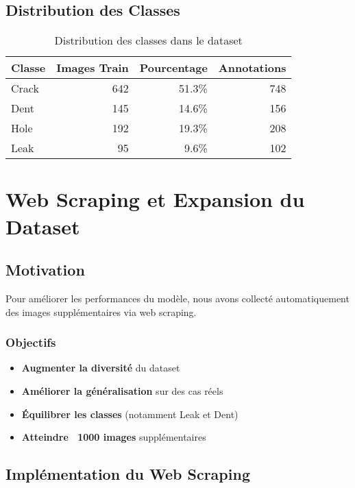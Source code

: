 \documentclass[a4paper,12pt]{report}
\begin{document}
\section{Distribution des Classes}

\begin{table}[H]
    \centering
    \begin{tabular}{|l|r|r|r|}
    \hline
    \textbf{Classe} & \textbf{Images Train} & \textbf{Pourcentage} & \textbf{Annotations} \\
    \hline
    Crack & 642 & 51.3\% & 748 \\
    \hline
    Dent & 145 & 14.6\% & 156 \\
    \hline
    Hole & 192 & 19.3\% & 208 \\
    \hline
    Leak & 95 & 9.6\% & 102 \\
    \hline
    \end{tabular}
    \caption{Distribution des classes dans le dataset}
\end{table}

\chapter{Web Scraping et Expansion du Dataset}

\section{Motivation}

Pour améliorer les performances du modèle, nous avons collecté automatiquement des images supplémentaires via web scraping.

\subsection{Objectifs}

\begin{itemize}
    \item \textbf{Augmenter la diversité} du dataset
    \item \textbf{Améliorer la généralisation} sur des cas réels
    \item \textbf{Équilibrer les classes} (notamment Leak et Dent)
    \item \textbf{Atteindre ~1000 images} supplémentaires
\end{itemize}

\section{Implémentation du Web Scraping}
\end{document}

